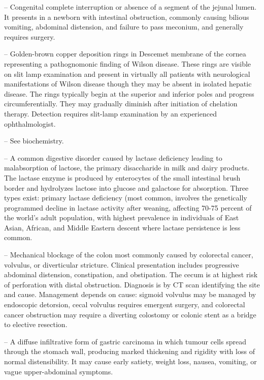 -- Congenital complete interruption or absence of a segment of the jejunal lumen. It presents in a newborn with intestinal obstruction, commonly causing bilious vomiting, abdominal distension, and failure to pass meconium, and generally requires surgery.

-- Golden-brown copper deposition rings in Descemet membrane of the cornea representing a pathognomonic finding of Wilson disease. These rings are visible on slit lamp examination and present in virtually all patients with neurological manifestations of Wilson disease though they may be absent in isolated hepatic disease. The rings typically begin at the superior and inferior poles and progress circumferentially. They may gradually diminish after initiation of chelation therapy. Detection requires slit-lamp examination by an experienced ophthalmologist.

-- See biochemistry.

-- A common digestive disorder caused by lactase deficiency leading to malabsorption of lactose, the primary disaccharide in milk and dairy products. The lactase enzyme is produced by enterocytes of the small intestinal brush border and hydrolyzes lactose into glucose and galactose for absorption. Three types exist: primary lactase deficiency (most common, involves the genetically programmed decline in lactase activity after weaning, affecting 70-75 percent of the world's adult population, with highest prevalence in individuals of East Asian, African, and Middle Eastern descent where lactase persistence is less common.

-- Mechanical blockage of the colon most commonly caused by colorectal cancer, volvulus, or diverticular stricture. Clinical presentation includes progressive abdominal distension, constipation, and obstipation. The cecum is at highest risk of perforation with distal obstruction. Diagnosis is by CT scan identifying the site and cause. Management depends on cause: sigmoid volvulus may be managed by endoscopic detorsion, cecal volvulus requires emergent surgery, and colorectal cancer obstruction may require a diverting colostomy or colonic stent as a bridge to elective resection.

-- A diffuse infiltrative form of gastric carcinoma in which tumour cells spread through the stomach wall, producing marked thickening and rigidity with loss of normal distensibility. It may cause early satiety, weight loss, nausea, vomiting, or vague upper-abdominal symptoms.


